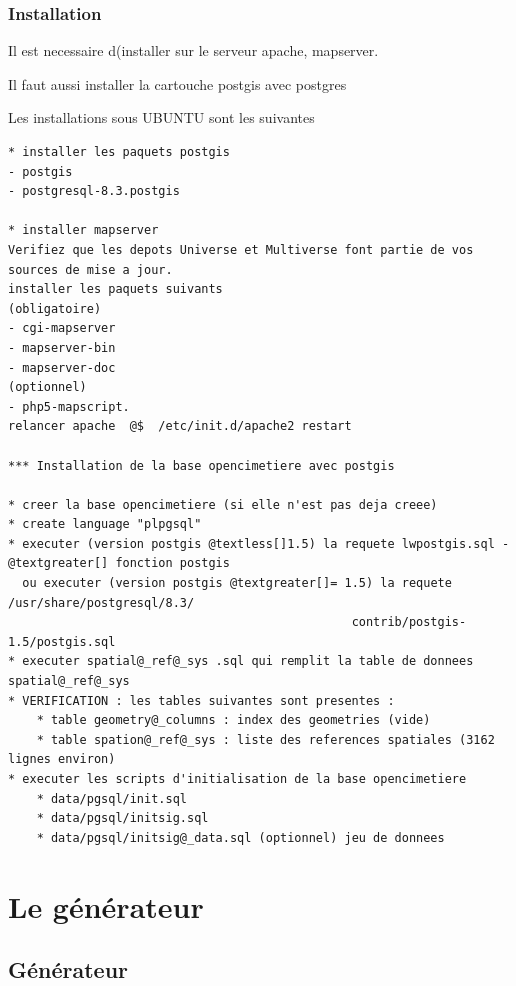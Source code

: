 \documentclass[letterpaper,10pt,french]{manual}
\begin{document}
\subsection{Installation}

Il est necessaire d(installer sur le serveur apache, mapserver.

Il faut aussi installer la cartouche postgis avec postgres

Les installations sous UBUNTU sont les suivantes

\begin{Verbatim}[commandchars=@\[\]]
* installer les paquets postgis
- postgis
- postgresql-8.3.postgis

* installer mapserver
Verifiez que les depots Universe et Multiverse font partie de vos sources de mise a jour.
installer les paquets suivants
(obligatoire)
- cgi-mapserver
- mapserver-bin
- mapserver-doc
(optionnel)
- php5-mapscript.
relancer apache  @$  /etc/init.d/apache2 restart

*** Installation de la base opencimetiere avec postgis

* creer la base opencimetiere (si elle n'est pas deja creee)
* create language "plpgsql"
* executer (version postgis @textless[]1.5) la requete lwpostgis.sql -@textgreater[] fonction postgis
  ou executer (version postgis @textgreater[]= 1.5) la requete /usr/share/postgresql/8.3/
                                                contrib/postgis-1.5/postgis.sql
* executer spatial@_ref@_sys .sql qui remplit la table de donnees spatial@_ref@_sys
* VERIFICATION : les tables suivantes sont presentes :
    * table geometry@_columns : index des geometries (vide)
    * table spation@_ref@_sys : liste des references spatiales (3162 lignes environ)
* executer les scripts d'initialisation de la base opencimetiere
    * data/pgsql/init.sql
    * data/pgsql/initsig.sql
    * data/pgsql/initsig@_data.sql (optionnel) jeu de donnees
\end{Verbatim}


\chapter{Le générateur}

\resetcurrentobjects
\hypertarget{--doc-generateur/index}{}

\section{Générateur}
\end{document}
